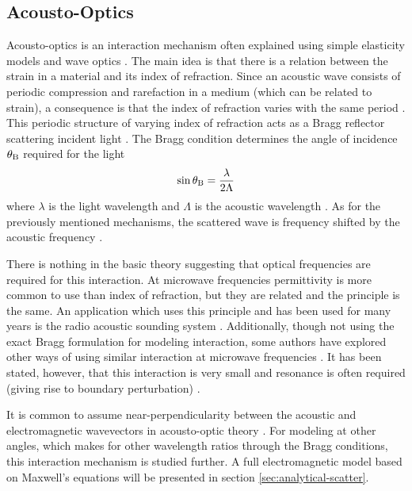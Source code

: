 \documentclass[11pt,twoside]{eitExjobb}
\begin{document}
	\subsection{Acousto-Optics}
	Acousto-optics is an interaction mechanism often explained using simple elasticity models and wave optics \cite{Saleh2007}\cite{Korpel1981}. The main idea is that there is a relation between the strain in a material and its index of refraction. Since an acoustic wave consists of periodic compression and rarefaction in a medium (which can be related to strain), a consequence is that the index of refraction varies with the same period \cite{Saleh2007}. This periodic structure of varying index of refraction acts as a Bragg reflector scattering incident light \cite{Saleh2007}. The Bragg condition determines the angle of incidence $\theta_{\mathrm{B}}$ required for the light
	\begin{equation*}
		\sin{\theta_{\mathrm{B}}} = \frac{\lambda}{2\Lambda}
	\end{equation*}
	where $\lambda$ is the light wavelength and $\Lambda$ is the acoustic wavelength \cite{Saleh2007}. As for the previously mentioned mechanisms, the scattered wave is frequency shifted by the acoustic frequency \cite{Korpel1988}.
	
	There is nothing in the basic theory suggesting that optical frequencies are required for this interaction. At microwave frequencies permittivity is more common to use than index of refraction, but they are related and the principle is the same. An application which uses this principle and has been used for many years is the radio acoustic sounding system \cite{Buerkle2007}. Additionally, though not using the exact Bragg formulation for modeling interaction, some authors have explored other ways of using similar interaction at microwave frequencies \cite{Lawrence2001}\cite{Merkel2006}. It has been stated, however, that this interaction is very small and resonance is often required (giving rise to boundary perturbation) \cite{Buerkle2007}.
	
	It is common to assume near-perpendicularity between the acoustic and electromagnetic wavevectors in acousto-optic theory \cite{Korpel1988}. For modeling at other angles, which makes for other wavelength ratios through the Bragg conditions, this interaction mechanism is studied further. A full electromagnetic model based on Maxwell's equations will be presented in section \ref{sec:analytical-scatter}.
	
\end{document}

